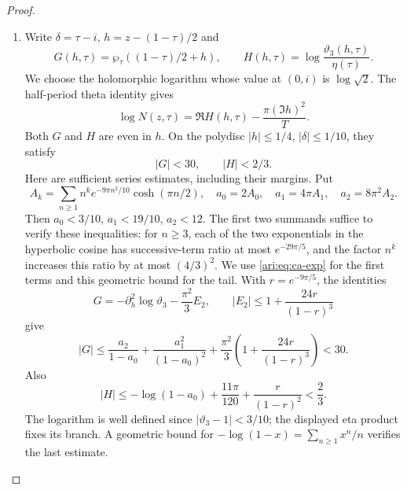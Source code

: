 \begin{proof}
\begin{enumerate}[label=\arabic*.,leftmargin=*]
\item Write $\delta=\tau-i$, $h=z-(1-\tau)/2$ and
\[
 G(h,\tau)=\wp_\tau((1-\tau)/2+h),\qquad
 H(h,\tau)=\log\frac{\vartheta_3(h,\tau)}{\eta(\tau)}.
\]
We choose the holomorphic logarithm whose value at $(0,i)$ is
$\log\sqrt2$. The half-period theta identity gives
\begin{equation}\label{ari:eq:ca-H}
 \log N(z,\tau)=\Re H(h,\tau)-\frac{\pi(\Im h)^2}{T}.
\end{equation}
Both $G$ and $H$ are even in $h$. On the polydisc
$|h|\le1/4$, $|\delta|\le1/10$, they satisfy
\begin{equation}\label{ari:eq:ca-GHbounds}
 |G|<30,\qquad |H|<2/3.
\end{equation}
Here are sufficient series estimates, including their margins.
Put
\[
 A_k=\sum_{n\ge1}n^k e^{-9\pi n^2/10}\cosh(\pi n/2),
 \quad a_0=2A_0,\quad a_1=4\pi A_1,\quad a_2=8\pi^2A_2.
\]
Then $a_0<3/10$, $a_1<19/10$, $a_2<12$.
The first two summands suffice to verify these inequalities: for
$n\ge3$, each of the two exponentials in the hyperbolic cosine
has successive-term ratio at most $e^{-29\pi/5}$, and the
factor $n^k$ increases this ratio by at most $(4/3)^2$.
We use \eqref{ari:eq:ca-exp} for the first terms and this geometric
bound for the tail. With $r=e^{-9\pi/5}$, the identities
\[
 G=-\partial_h^2\log\vartheta_3-\frac{\pi^2}{3}E_2,
 \qquad
 |E_2|\le1+\frac{24r}{(1-r)^3}
\]
give
\[
 |G|\le\frac{a_2}{1-a_0}+\frac{a_1^2}{(1-a_0)^2}
       +\frac{\pi^2}{3}\left(1+\frac{24r}{(1-r)^3}\right)<30.
\]
Also
\[
 |H|\le-\log(1-a_0)+\frac{11\pi}{120}
                    +\frac{r}{(1-r)^2}<\frac23.
\]
The logarithm is well defined since $|\vartheta_3-1|<3/10$;
the displayed eta product fixes its branch. A geometric bound
for $-\log(1-x)=\sum_{n\ge1}x^n/n$ verifies the last estimate.


\end{enumerate}
\end{proof}

